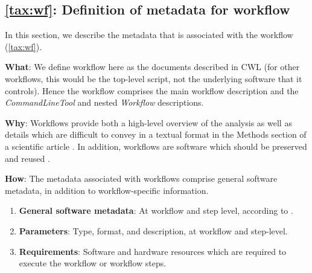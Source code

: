 \subsection{\ref{tax:wf}: Definition of metadata for workflow}
\label{sec:wf_reqs}

In this section, we describe the metadata that is associated with the workflow (\ref{tax:wf}). 

\textbf{What}: We define workflow here as the documents described in CWL (for other workflows, this would be the top-level script, not the underlying software that it controls). Hence the workflow comprises the main workflow description and the \emph{CommandLineTool} and nested \emph{Workflow} descriptions. 

\textbf{Why}: Workflows provide both a high-level overview of the analysis as well as details which are difficult to convey in a textual format in the Methods section of a scientific article \cite{gilAutomatingDataNarratives2017}. In addition, workflows are software which should be preserved and reused \cite{gobleFAIRComputationalWorkflows2020}. 

\textbf{How}: The metadata associated with workflows comprise general software metadata, in addition to workflow-specific information. 
\begin{enumerate}[label=\textbf{WF\arabic*}]
\item \textbf{General software metadata}: At workflow and step level, according to . \label{req:wf_all}
\item \textbf{Parameters}: Type, format, and description, at workflow and step-level. \label{req:wf_param}
\item \textbf{Requirements}: Software and hardware resources which are required to execute the workflow or workflow steps. \label{req:wf_resources}
\end{enumerate}
